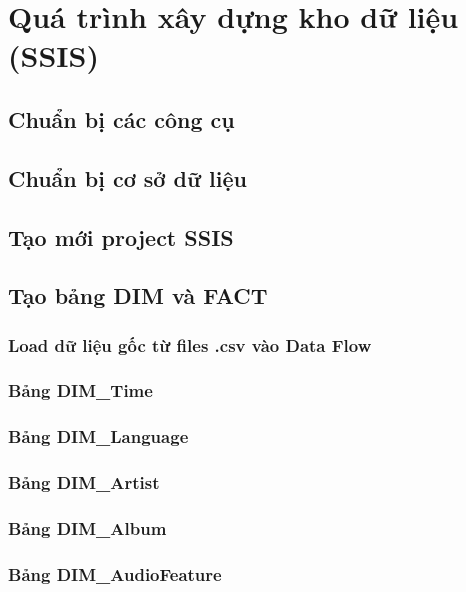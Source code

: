 \newpage
\section{Quá trình xây dựng kho dữ liệu (SSIS)}
\subsection{Chuẩn bị các công cụ}

\subsection{Chuẩn bị cơ sở dữ liệu}

\subsection{Tạo mới project SSIS}

\subsection{Tạo bảng DIM và FACT}

\subsubsection{Load dữ liệu gốc từ files .csv vào Data Flow}

\subsubsection{Bảng DIM\_Time}

\subsubsection{Bảng DIM\_Language}

\subsubsection{Bảng DIM\_Artist}

\subsubsection{Bảng DIM\_Album}

\subsubsection{Bảng DIM\_AudioFeature}

